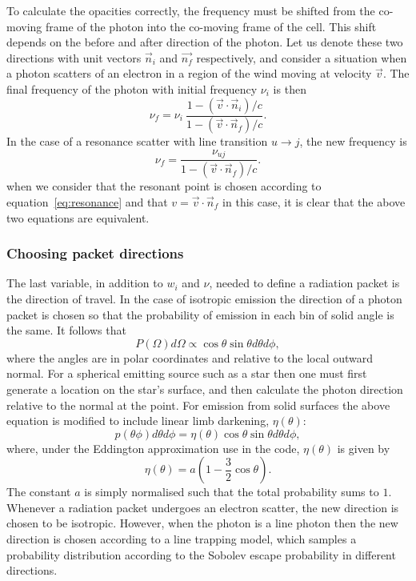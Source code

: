 To calculate the opacities correctly, the frequency must be shifted from
the co-moving frame of the photon into the co-moving frame of the cell.
This shift depends on the before and after direction of the photon. Let us denote
these two directions with unit vectors $\vec{n}_i$ and $\vec{n_f}$ respectively,
and consider a situation when a photon scatters of an electron in a region of the
wind moving at velocity $\vec{v}$.
The final frequency of the photon with initial frequency $\nu_i$ is then 
\begin{equation}
\nu_f = \nu_i ~\frac{1 - (\vec{v} \cdot \vec{n}_i) / c}{1 - (\vec{v} \cdot \vec{n}_f) / c}.
\end{equation}
In the case of a resonance scatter with line transition $u \rightarrow j$, the 
new frequency is
\begin{equation}
\nu_f = \frac{\nu_{uj}}{1 - (\vec{v} \cdot \vec{n}_f) / c}.
\end{equation}
when we consider that the resonant point is chosen according to 
equation~\ref{eq:resonance} and that $v=\vec{v} \cdot \vec{n}_f$ in this case,
it is clear that the above two equations are equivalent.


\subsubsection{Choosing packet directions}

The last variable, in addition to $w_i$ and $\nu$, needed to define a 
radiation packet is the direction of travel.
In the case of isotropic emission the direction of a photon packet
is chosen so that the probability of emission in each bin of solid
angle is the same. It follows that 
\begin{equation}
P(\Omega)d\Omega \propto \cos \theta \sin \theta d\theta d\phi,
\end{equation}
where the angles are in polar coordinates and relative to the local
outward normal. For a spherical emitting source such as 
a star then one must first generate a location on the star's surface,
and then calculate the photon direction relative to the normal at the point.
For emission from solid surfaces the above equation is modified
to include linear limb darkening, $\eta(\theta)$:
\begin{equation}
p(\theta \phi) d\theta d\phi = \eta(\theta) \cos \theta \sin \theta d\theta d\phi,
\end{equation}
where, under the Eddington approximation use in the code, $\eta(\theta)$
is given by
\begin{equation}
\eta(\theta) = a (1 - \frac{3}{2} \cos \theta).
\end{equation}
The constant $a$ is simply normalised such that the total probability
sums to $1$. Whenever a radiation packet undergoes an electron scatter,
the new direction is chosen to be isotropic. However,
when the photon is a line photon then the new direction is chosen
according to a line trapping model, which samples a probability 
distribution according to the Sobolev escape probability in different 
directions. 


